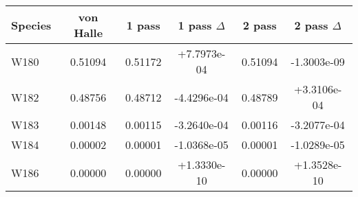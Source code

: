 \begin{tabular}{|l||c||c|c||c|c|}
\hline
\bf{Species} & \bf{von Halle} & \bf{1 pass} & \bf{1 pass $\Delta$} & \bf{2 pass} & \bf{2 pass $\Delta$} \\ 
\hline
W180 & 0.51094 & 0.51172 & +7.7973e-04 & 0.51094 & -1.3003e-09 \\ 
\hline
W182 & 0.48756 & 0.48712 & -4.4296e-04 & 0.48789 & +3.3106e-04 \\ 
\hline
W183 & 0.00148 & 0.00115 & -3.2640e-04 & 0.00116 & -3.2077e-04 \\ 
\hline
W184 & 0.00002 & 0.00001 & -1.0368e-05 & 0.00001 & -1.0289e-05 \\ 
\hline
W186 & 0.00000 & 0.00000 & +1.3330e-10 & 0.00000 & +1.3528e-10 \\ 
\hline
\end{tabular}
